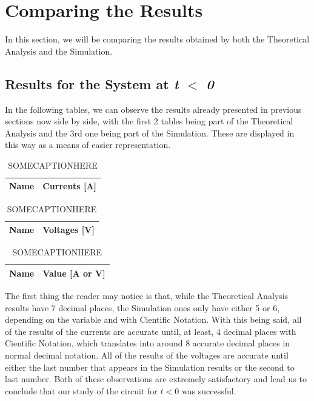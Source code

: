 \clearpage

\section{Comparing the Results}
\label{sec:comparing}

In this section, we will be comparing the results obtained by both the Theoretical Analysis and the Simulation.

\subsection{Results for the System at \textit{t $<$ 0}}

In the following tables, we can observe the results already presented in previous sections now side by side, with the first
2 tables being part of the Theoretical Analysis and the 3rd one being part of the Simulation. These are displayed in this
way as a means of easier representation.

\begin{table}[htb!]
  \begin{tabular}{|l|r|}
      \hline    
      {\bf Name} & {\bf Currents [A]} \\ \hline
      
  \end{tabular}
\quad
  \begin{tabular}{|l|r|}
    \hline    
    {\bf Name} & {\bf Voltages [V]} \\ \hline
    
  \end{tabular}
\quad
  \begin{tabular}{|l|r|}
    \hline    
    {\bf Name} & {\bf Value [A or V]} \\ \hline
    
  \end{tabular}
  \caption{SOMECAPTIONHERE}
\end{table}

The first thing the reader may notice is that, while the Theoretical Analysis results have 7 decimal places, the Simulation ones only have either 5 or 6, depending on the variable and with Cientific Notation. With this being said, all of the results of the currents are accurate until, at least, 4 decimal places with Cientific Notation, which translates into around 8 accurate decimal places in normal decimal notation. All of the results of the voltages are accurate until either the last number that appears in the Simulation results or the second to last number. Both of these observations are extremely satisfactory and lead us to conclude that our study of the circuit for $t < 0$ was successful.

